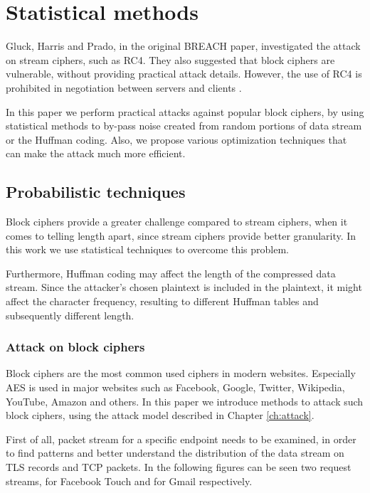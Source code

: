 \chapter{Statistical methods}\label{ch:statistic}

Gluck, Harris and Prado, in the original BREACH paper, investigated the attack
on stream ciphers, such as RC4. They also suggested that block ciphers are
vulnerable, without providing practical attack details. However, the use of RC4
is prohibited in negotiation between servers and clients \cite{rc4_prohibit}.

In this paper we perform practical attacks against popular block ciphers, by
using statistical methods to by-pass noise created from random portions of data
stream or the Huffman coding. Also, we propose various optimization techniques
that can make the attack much more efficient.

\section{Probabilistic techniques}\label{sec:probabilistic}

Block ciphers provide a greater challenge compared to stream ciphers, when it
comes to telling length apart, since stream ciphers provide better granularity.
In this work we use statistical techniques to overcome this problem.

Furthermore, Huffman coding may affect the length of the compressed data stream.
Since the attacker's chosen plaintext is included in the plaintext, it might
affect the character frequency, resulting to different Huffman tables and
subsequently different length.

\subsection{Attack on block ciphers}

Block ciphers are the most common used ciphers in modern websites. Especially
AES \cite{aes} is used in major websites such as Facebook, Google, Twitter,
Wikipedia, YouTube, Amazon and others. In this paper we introduce methods to
attack such block ciphers, using the attack model described in Chapter
\ref{ch:attack}.

First of all, packet stream for a specific endpoint needs to be examined, in
order to find patterns and better understand the distribution of the data stream
on TLS records and TCP packets. In the following figures can be seen two request
streams, for Facebook Touch and for Gmail respectively.

